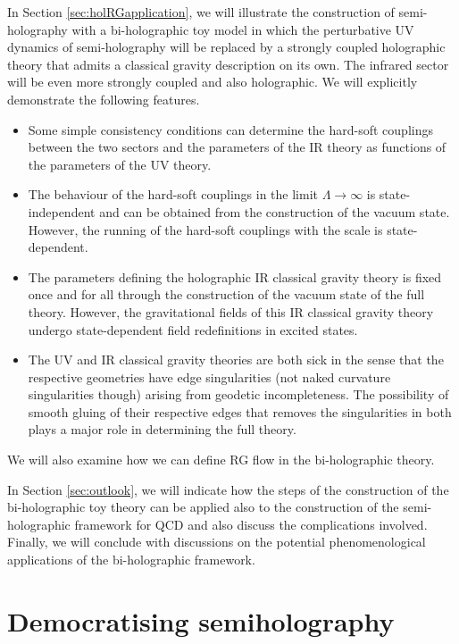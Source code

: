 \documentclass[prd,reprint,a4paper,showpacs,superscriptaddress,11pt,onecolumn,nofootinbib]{revtex4-1}
\renewcommand{\(}{\left(}
\renewcommand{\)}{\right)}
\newcommand{\6}{\partial}
\begin{document}
In Section \ref{sec:holRGapplication}, we will illustrate the construction of semi-holography with a bi-holographic toy model in which the perturbative UV dynamics of semi-holography will be replaced by a strongly coupled holographic theory that admits a classical gravity description on its own. The infrared sector will be even more strongly coupled and also holographic. We will explicitly demonstrate the following features.
\begin{itemize}
\item Some simple consistency conditions can determine the hard-soft couplings between the two sectors and the parameters of the IR theory as functions of the parameters of the UV theory.
\item The behaviour of the hard-soft couplings in the limit $\Lambda \rightarrow \infty$ is state-independent and can be obtained from the construction of the vacuum state. However, the running of the hard-soft couplings with the scale is state-dependent.
\item The parameters defining the holographic IR classical gravity theory is fixed once and for all through the construction of the vacuum state of the full theory. However, the gravitational fields of this IR classical gravity theory undergo state-dependent field redefinitions in excited states.
\item The UV and IR classical gravity theories are both sick in the sense that the respective geometries have edge singularities (not naked curvature singularities though) arising from geodetic incompleteness. The possibility of smooth gluing of their respective edges that removes the singularities in both plays a major role in determining the full theory.
\end{itemize}
We will also examine how we can define RG flow in the bi-holographic theory.

In Section \ref{sec:outlook}, we will indicate how the steps of the construction of the bi-holographic toy theory can be applied also to the construction of the semi-holographic framework for QCD and also discuss the complications involved. Finally, we will conclude with discussions on the potential phenomenological applications of the bi-holographic framework.

\section{Democratising semiholography}\label{sec:democracy}
\end{document}
